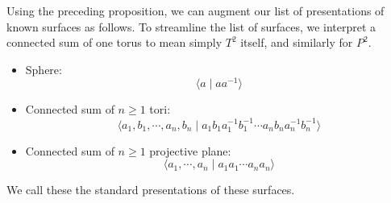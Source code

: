 \begin{example}
Using the preceding proposition, we can augment our list of presentations of known surfaces as follows. To streamline the list of surfaces, we interpret a connected sum of one torus to mean simply $T^2$ itself, and similarly for $P^2$.
\begin{itemize}
\item Sphere:
\[\langle a\mid aa^{-1}\rangle\]
\item Connected sum of $n\geq 1$ tori:
\[\langle a_1,b_1,\cdots,a_n,b_n\mid a_1b_1a_1^{-1}b_1^{-1}\cdots a_nb_na_n^{-1}b_n^{-1}\rangle\]
\item Connected sum of $n\geq 1$ projective plane:
\[\langle a_1,\cdots,a_n\mid a_1a_1\cdots a_na_n\rangle\]
\end{itemize}
We call these the standard presentations of these surfaces.
\end{example}
